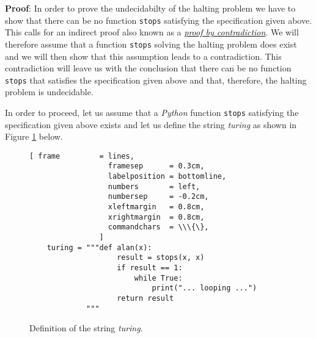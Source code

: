 \noindent
\textbf{Proof}:  In order to prove the undecidabilty of the halting problem we have to show that
there can be no function \texttt{stops} satisfying the specification given above.  This calls for an
indirect proof also known as a \href{http://en.wikipedia.org/wiki/Indirect_proof}{\emph{proof by contradiction}}.
We will therefore assume that a function \texttt{stops} solving the halting problem does
exist and we will then show that this assumption leads to a contradiction.  This contradiction will
leave us with the conclusion that there can be no function \texttt{stops} that satisfies
the specification given above and that, therefore, the halting problem is undecidable.

In order to proceed, let us assume that a \textsl{Python} function \texttt{stops}
satisfying the specification given above exists and let us define the string
\textsl{turing} as shown in Figure \ref{fig:turing-string} below.

\begin{figure}[!h]
  \centering
\begin{Verbatim}[ frame         = lines, 
                  framesep      = 0.3cm, 
                  labelposition = bottomline,
                  numbers       = left,
                  numbersep     = -0.2cm,
                  xleftmargin   = 0.8cm,
                  xrightmargin  = 0.8cm,
                  commandchars  = \\\{\},
                ]
    turing = """def alan(x):
                    result = stops(x, x)
                    if result == 1:
                        while True:
                            print("... looping ...")
                    return result
             """ 
\end{Verbatim}
  \vspace*{-0.3cm}
  \caption{Definition of the string \textsl{turing}.}
  \label{fig:turing-string}
\end{figure}

